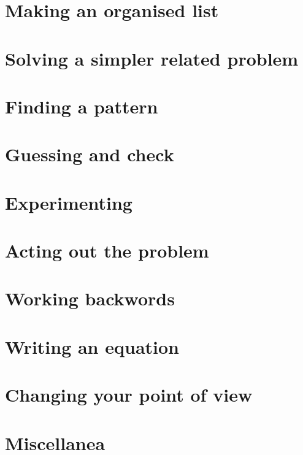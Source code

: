 \section{Making an organised list}
\label{sec:making-an-organised-list}

\section{Solving a simpler related problem}
\label{sec:solving-a-simpler-related-problem}

\section{Finding a pattern}
\label{sec:finding-a-pattern}

\section{Guessing and check}
\label{sec:guessing-and-check}

\section{Experimenting}
\label{sec:experimenting}

\section{Acting out the problem}
\label{sec:acting-out-the-problem}

\section{Working backwords}
\label{sec:working-backwards}

\section{Writing an equation}
\label{sec:writing-an-equation}

\section{Changing your point of view}
\label{sec:changing-your-point-of-view}

\section{Miscellanea}
\label{sec:miscellanea}






